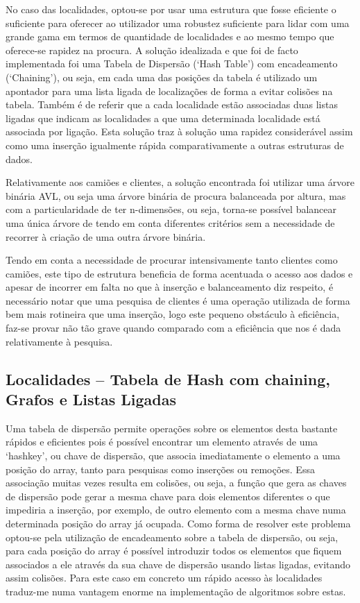 \documentclass[a5paper,twocolumn, 11pt]{article}
\def\hyph{-\penalty0\hskip0pt\relax}
\begin{document}
No caso das localidades, optou-se por usar uma estrutura que fosse eficiente o suficiente para oferecer ao utilizador uma robustez suficiente para lidar com uma grande gama em termos de quantidade de localidades e ao mesmo tempo que oferece-se rapidez na procura. A solução idealizada e que foi de facto implementada foi uma Tabela de Dispersão (‘Hash Table’) com encadeamento (‘Chaining’), ou seja, em cada uma das posições da tabela é utilizado um apontador para uma lista ligada de localizações de forma a evitar colisões na tabela. Também é de referir que a cada localidade estão associadas duas listas ligadas que indicam as localidades a que uma determinada localidade está associada por ligação. Esta solução traz à solução uma rapidez considerável assim como uma inserção igualmente rápida comparativamente a outras estruturas de dados.

Relativamente aos camiões e clientes, a solução encontrada foi utilizar uma árvore binária AVL, ou seja uma árvore binária de procura balanceada por altura, mas com a particularidade de ter n\hyph{}dimensões, ou seja, torna-se possível balancear uma única árvore de tendo em conta diferentes critérios sem a necessidade de recorrer à criação de uma outra árvore binária.

Tendo em conta a necessidade de procurar intensivamente tanto clientes como camiões, este tipo de estrutura beneficia de forma acentuada o acesso aos dados e apesar de incorrer em falta no que à inserção e balanceamento diz respeito, é necessário notar que uma pesquisa de clientes é uma operação utilizada de forma bem mais rotineira que uma inserção, logo este pequeno obstáculo à eficiência, faz-se provar não tão grave quando comparado com a eficiência que nos é dada relativamente à pesquisa.


\clearpage
\subsection[Localidades]{Localidades -- Tabela de Hash com chaining, Grafos e Listas Ligadas}
Uma tabela de dispersão permite operações sobre os elementos desta bastante rápidos e eficientes pois é possível encontrar um elemento através de uma `hashkey', ou chave de dispersão, que associa imediatamente o elemento a uma posição do array, tanto para pesquisas como inserções ou remoções. Essa associação muitas vezes resulta em colisões, ou seja, a função que gera as chaves de dispersão pode gerar a mesma chave para dois elementos diferentes o que impediria a inserção, por exemplo, de outro elemento com a mesma chave numa determinada posição do array já ocupada. Como forma de resolver este problema optou-se pela utilização de encadeamento sobre a tabela de dispersão, ou seja, para cada posição do array é possível introduzir todos os elementos que fiquem associados a ele através da sua chave de dispersão usando listas ligadas, evitando assim colisões. Para este caso em concreto um rápido acesso às localidades traduz-me numa vantagem enorme na implementação de
algoritmos sobre estas.
\end{document}

